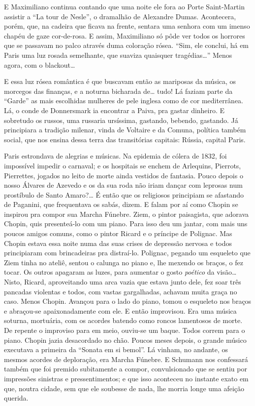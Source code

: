 E Maximiliano continua contando que uma noite ele fora ao Porte
Saint-Martin assistir a ``La tour de Nesle'', o dramalhão de Alexandre
Dumas. Acontecera, porém, que, na cadeira que ficava na frente, sentara
uma senhora com um imenso chapéu de gaze cor-de-rosa. E assim,
Maximiliano só pôde ver todos os horrores que se passavam no palco
através duma coloração rósea. ``Sim, ele conclui, há em Paris uma luz
rosada semelhante, que suaviza quaisquer tragédias\ldots{}'' Menos agora, com
o blackout\ldots{}

E essa luz rósea romântica é que buscavam então as mariposas da música,
os morcegos das finanças, e a noturna bicharada de\ldots{} tudo! Lá faziam
parte da ``Garde'' as mais escolhidas mulheres de pele inglesa como de
cor mediterrânea. Lá, o conde de Donnersmark ia encontrar a Paiva, pra
gastar dinheiro. E sobretudo os russos, uma russaria ursíssima,
gastando, bebendo, gastando. Já principiara a tradição milenar, vinda de
Voltaire e da Comuna, política também social, que nos ensina dessa terra
das transitórias capitais: Rússia, capital Paris.

Paris estrondava de alegrias e músicas. Na epidemia de cólera de 1832,
foi impossível impedir o carnaval; e os hospitais se enchem de
Arlequins, Pierrots, Pierrettes, jogados no leito de morte ainda
vestidos de fantasia. Pouco depois o nosso Álvares de Azevedo e os da
sua roda não iriam dançar com leprosas num prostíbulo de Santo Amaro?\ldots{}
É então que os religiosos principiam se afastando de Paganini, que
frequentava os sabás, dizem. E falam por aí como Chopin se inspirou pra
compor sua Marcha Fúnebre. Ziem, o pintor paisagista, que adorava
Chopin, quis presenteá-lo com um piano. Para isso deu um jantar, com
mais uns poucos amigos comuns, como o pintor Ricard e o príncipe de
Polignac. Mas Chopin estava essa noite numa das suas crises de depressão
nervosa e todos principiaram com brincadeiras pra distraí-lo. Polignac,
pegando um esqueleto que Ziem tinha no ateliê, sentou o calunga no piano
e, lhe mexendo os braços, o fez tocar. Os outros apagaram as luzes, para
aumentar o gosto \textit{poético} da visão\ldots{} Nisto, Ricard, aproveitando uma
arca vazia que estava junto dele, fez soar três pancadas violentas e
todos, com vastas gargalhadas, achavam muita graça no caso. Menos
Chopin. Avançou para o lado do piano, tomou o esqueleto nos braços e
abraçou-se apaixonadamente com ele. E então improvisou. Era uma música
soturna, mortuária, com os acordes batendo como roncos lamentosos de
morte. De repente o improviso para em meio, ouviu-se um baque. Todos
correm para o piano. Chopin jazia desacordado no chão. Poucos meses
depois, o grande músico executava a primeira da ``Sonata em si bemol''.
Lá vinham, no andante, os mesmos acordes de deploração, era Marcha
Fúnebre. E Schumann nos confessará também que foi premido subitamente a
compor, convulsionado que se sentiu por impressões sinistras e
pressentimentos; e que isso aconteceu no instante exato em que, noutra
cidade, sem que ele soubesse de nada, lhe morria longe uma afeição
querida.

